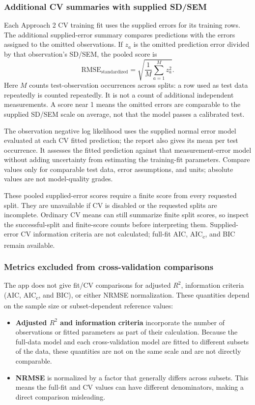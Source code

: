 \subsubsection*{Additional CV summaries with supplied SD/SEM}

Each Approach 2 CV training fit uses the supplied errors for its training rows. The additional supplied-error summary compares predictions with the errors assigned to the omitted observations. If $z_a$ is the omitted prediction error divided by that observation's SD/SEM, the pooled score is
\[
\mathrm{RMSE}_{\mathrm{standardized}}=\sqrt{\frac{1}{M}\sum_{a=1}^{M}z_a^2}.
\]
Here $M$ counts test-observation occurrences across splits: a row used as test data repeatedly is counted repeatedly. It is not a count of additional independent measurements. A score near 1 means the omitted errors are comparable to the supplied SD/SEM scale on average, not that the model passes a calibrated test.

The observation negative log likelihood uses the supplied normal error model evaluated at each CV fitted prediction; the report also gives its mean per test occurrence. It assesses the fitted prediction against that measurement-error model without adding uncertainty from estimating the training-fit parameters. Compare values only for comparable test data, error assumptions, and units; absolute values are not model-quality grades.

These pooled supplied-error scores require a finite score from every requested split. They are unavailable if CV is disabled or the requested splits are incomplete. Ordinary CV means can still summarize finite split scores, so inspect the successful-split and finite-score counts before interpreting them. Supplied-error CV information criteria are not calculated; full-fit AIC, AIC\textsubscript{c}, and BIC remain available.

\subsubsection*{Metrics excluded from cross-validation comparisons}

The app does not give fit/CV comparisons for adjusted $R^2$, information criteria (AIC, AIC\textsubscript{c}, and BIC), or either NRMSE normalization. These quantities depend on the sample size or subset-dependent reference values:

\begin{itemize}
    \item \textbf{Adjusted $R^2$ and information criteria} incorporate the number of observations or fitted parameters as part of their calculation. Because the full-data model and each cross-validation model are fitted to different subsets of the data, these quantities are not on the same scale and are not directly comparable.
    \item \textbf{NRMSE} is normalized by a factor that generally differs across subsets. This means the full-fit and CV values can have different denominators, making a direct comparison misleading.
\end{itemize}

